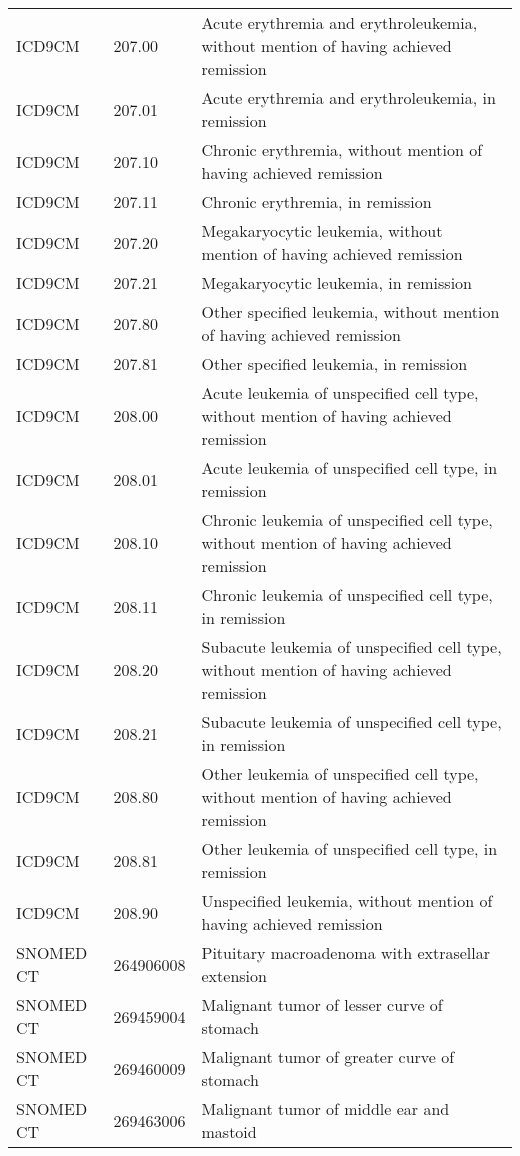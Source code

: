 \begin{longtable}{p{}p{}p{}}
  ICD9CM & 207.00 & Acute erythremia and erythroleukemia, without mention of having achieved remission \\ 
  ICD9CM & 207.01 & Acute erythremia and erythroleukemia, in remission \\ 
  ICD9CM & 207.10 & Chronic erythremia, without mention of having achieved remission \\ 
  ICD9CM & 207.11 & Chronic erythremia, in remission \\ 
  ICD9CM & 207.20 & Megakaryocytic leukemia, without mention of having achieved remission \\ 
  ICD9CM & 207.21 & Megakaryocytic leukemia, in remission \\ 
  ICD9CM & 207.80 & Other specified leukemia, without mention of having achieved remission \\ 
  ICD9CM & 207.81 & Other specified leukemia, in remission \\ 
  ICD9CM & 208.00 & Acute leukemia of unspecified cell type, without mention of having achieved remission \\ 
  ICD9CM & 208.01 & Acute leukemia of unspecified cell type, in remission \\ 
  ICD9CM & 208.10 & Chronic leukemia of unspecified cell type, without mention of having achieved remission \\ 
  ICD9CM & 208.11 & Chronic leukemia of unspecified cell type, in remission \\ 
  ICD9CM & 208.20 & Subacute leukemia of unspecified cell type, without mention of having achieved remission \\ 
  ICD9CM & 208.21 & Subacute leukemia of unspecified cell type, in remission \\ 
  ICD9CM & 208.80 & Other leukemia of unspecified cell type, without mention of having achieved remission \\ 
  ICD9CM & 208.81 & Other leukemia of unspecified cell type, in remission \\ 
  ICD9CM & 208.90 & Unspecified leukemia, without mention of having achieved remission \\ 
  SNOMED CT & 264906008 & Pituitary macroadenoma with extrasellar extension \\ 
  SNOMED CT & 269459004 & Malignant tumor of lesser curve of stomach \\ 
  SNOMED CT & 269460009 & Malignant tumor of greater curve of stomach \\ 
  SNOMED CT & 269463006 & Malignant tumor of middle ear and mastoid \\ 

\end{longtable}

